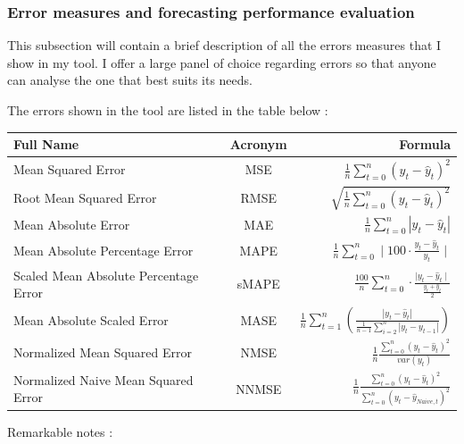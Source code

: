 \documentclass[11pt,a4paper,oneside]{book}
\begin{document}
\subsubsection{Error measures and forecasting performance evaluation}\label{errors}

This subsection will contain a brief description of all the errors measures that I show in my tool. I offer a large panel of choice regarding errors so that anyone can analyse the one that best suits its needs. 

The errors shown in the tool are listed in the table below  : \\


\begin{tabular}{|l|c|r|}
  \hline
   Full Name & Acronym & Formula \\
  \hline
  Mean Squared Error & MSE & $\frac{1}{n}\sum_{t=0}^n (y_t - \hat{y}_t)^2$ \\
  Root Mean Squared Error & RMSE & $\sqrt{\frac{1}{n} \sum_{t=0}^n (y_t - \hat{y}_t)^2}$ \\
  Mean Absolute Error & MAE & $\frac{1}{n} \sum_{t=0}^n |y_t - \hat{y}_t|$ \\
  Mean Absolute Percentage Error & MAPE & $\frac{1}{n} \sum_{t=0}^n  \mid 100 \cdot \frac{y_t - \hat{y}_t}{y_t}\mid$ \\
  Scaled Mean Absolute Percentage Error & sMAPE & $\frac{100}{n} \sum_{t=0}^n \cdot \frac{\mid y_t - \hat{y}_t\mid}{\frac{y_t+\hat{y}_t}{2}}$ \\
  Mean Absolute Scaled Error & MASE & $\frac{1}{n}\sum_{t=1}^n \left( \frac{\left| y_t - \hat{y}_t \right|}{\frac{1}{n-1}\sum_{i=2}^n \left| y_t-y_{t-1} \right|}\right)$ \\
  Normalized Mean Squared Error & NMSE & $\frac{1}{n}\frac{\sum_{t=0}^{n} (y_t-\hat{y}_t)^2}{var(y_t)}$ \\
  Normalized Naive Mean Squared Error & NNMSE & $\frac{1}{n}\frac{\sum_{t=0}^{n} (y_t-\hat{y}_t)^2}{\sum_{t=0}^{n} (y_t-\hat{y}_{Naive,t})^2}$ \\
  \hline
\end{tabular}  
\begin{flushright}
    \cite{Hyndman06} 
    \cite{nmse}
\end{flushright}



Remarkable notes : 
\end{document}
